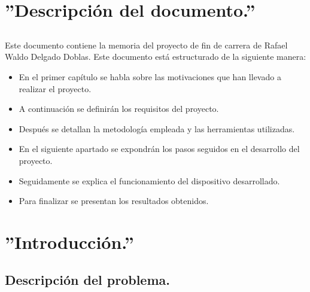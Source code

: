 \documentclass[a4paper,12pt,titlepage,final]{book}
\begin{document}
\maketitle

\tableofcontents

\mainmatter
\chapter{''Descripción del documento.''}
\section*{}
\subsection*{}
\subsubsection*{}

\paragraph{}
Este documento contiene la memoria del proyecto de fin de carrera de Rafael Waldo Delgado Doblas. Este documento está estructurado de la siguiente manera:

\begin{itemize}
  \item En el primer capítulo se habla sobre las motivaciones que han llevado a realizar el proyecto.
  \item A continuación se definirán los requisitos del proyecto.
  \item Después se detallan la metodología empleada y las herramientas utilizadas.
  \item En el siguiente apartado se expondrán los pasos seguidos en el desarrollo del proyecto.
  \item Seguidamente se explica el funcionamiento del dispositivo desarrollado.
  \item Para finalizar se presentan los resultados obtenidos.
\end{itemize}

\chapter{''Introducción.''}

\section{Descripción del problema.}
\end{document}
